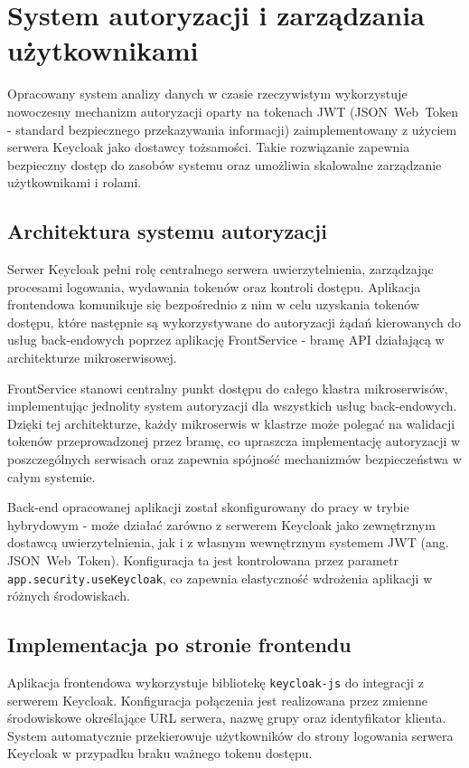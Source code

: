 \section{System autoryzacji i zarządzania użytkownikami}
\label{chap:autoryzacja}

Opracowany system analizy danych w czasie rzeczywistym wykorzystuje nowoczesny mechanizm autoryzacji oparty na tokenach JWT (\mbox{JSON Web Token} - standard bezpiecznego przekazywania informacji) zaimplementowany z użyciem serwera Keycloak jako dostawcy tożsamości. Takie rozwiązanie zapewnia bezpieczny dostęp do zasobów systemu oraz umożliwia skalowalne zarządzanie użytkownikami i rolami.

\subsection{Architektura systemu autoryzacji}

Serwer Keycloak pełni rolę centralnego serwera uwierzytelnienia, zarządzając procesami logowania, wydawania tokenów oraz kontroli dostępu. Aplikacja frontendowa komunikuje się bezpośrednio z nim w celu uzyskania tokenów dostępu, które następnie są wykorzystywane do autoryzacji żądań kierowanych do usług back-endowych poprzez aplikację FrontService - bramę API działającą w architekturze mikroserwisowej.

FrontService stanowi centralny punkt dostępu do całego klastra mikroserwisów, implementując jednolity system autoryzacji dla wszystkich usług back-endowych. Dzięki tej architekturze, każdy mikroserwis w klastrze może polegać na walidacji tokenów przeprowadzonej przez bramę, co upraszcza implementację autoryzacji w poszczególnych serwisach oraz zapewnia spójność mechanizmów bezpieczeństwa w całym systemie.

Back-end opracowanej aplikacji został skonfigurowany do pracy w trybie hybrydowym - może działać zarówno z serwerem Keycloak jako zewnętrznym dostawcą uwierzytelnienia, jak i z własnym wewnętrznym systemem JWT (ang. \mbox{JSON Web Token}). Konfiguracja ta jest kontrolowana przez parametr \texttt{app.security.useKeycloak}, co zapewnia elastyczność wdrożenia aplikacji w różnych środowiskach.

\subsection{Implementacja po stronie frontendu}

Aplikacja frontendowa wykorzystuje bibliotekę \texttt{keycloak-js} do integracji z serwerem Keycloak. Konfiguracja połączenia jest realizowana przez zmienne środowiskowe określające URL serwera, nazwę grupy oraz identyfikator klienta. System automatycznie przekierowuje użytkowników do strony logowania serwera Keycloak w przypadku braku ważnego tokenu dostępu.

